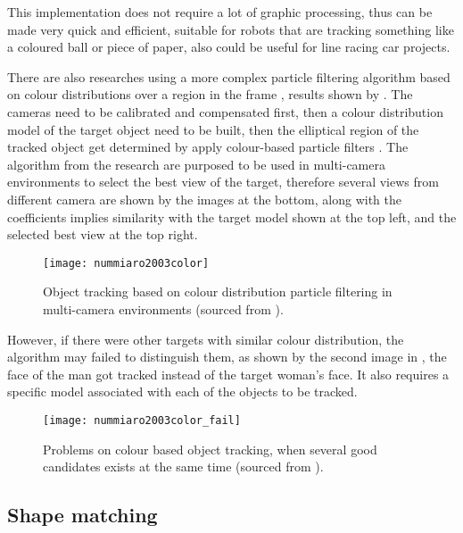 This implementation does not require a lot of graphic processing, thus can be made very quick and efficient, suitable for robots that are tracking something like a coloured ball or piece of paper, also could be useful for line racing car projects.

There are also researches using a more complex particle filtering algorithm based on colour distributions over a region in the frame \cite{nummiaro2003color}, results shown by . The cameras need to be calibrated and compensated first, then a colour distribution model of the target object need to be built, then the elliptical region of the tracked object get determined by apply colour-based particle filters \cite{nummiaro2003adaptive}. The algorithm from the research are purposed to be used in multi-camera environments to select the best view of the target, therefore several views from different camera are shown by the images at the bottom, along with the coefficients implies similarity with the target model shown at the top left, and the selected best view at the top right.

\begin{figure}[H]
  \centering
  \texttt{[image: nummiaro2003color]}
  \caption{Object tracking based on colour distribution particle filtering in multi-camera environments (sourced from \cite{nummiaro2003color}).}
  \label{Figure:nummiaro2003color}
\end{figure}

However, if there were other targets with similar colour distribution, the algorithm may failed to distinguish them, as shown by the second image in , the face of the man got tracked instead of the target woman's face. It also requires a specific model associated with each of the objects to be tracked.

\begin{figure}[H]
  \centering
  \texttt{[image: nummiaro2003color\_fail]}
  \caption{Problems on colour based object tracking, when several good candidates exists at the same time (sourced from \cite{nummiaro2003color}).}
  \label{Figure:nummiaro2003color_fail}
\end{figure}

\subsection{Shape matching}

